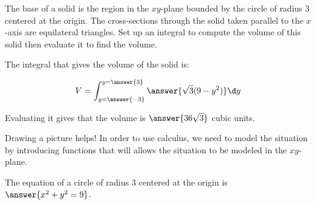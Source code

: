\documentclass{ximera}
\author{Jim Talamo and Alex Beckwith}
\begin{document}
\begin{exercise}
	The base of a solid is the region in the $xy$-plane bounded by the circle of radius 3 centered at the origin. The cross-sections through the solid taken parallel to the $x$-axis are equilateral triangles. Set up an integral to compute the volume of this solid then evaluate it to find the volume.
	
The integral that gives the volume of the solid is:

	\[
	V= \int_{y=\answer{-3}}^{y=\answer{3}}
	\answer{\sqrt{3} (9-y^2)}\d y
	\]

Evaluating it gives that the volume is $\answer{36\sqrt{3}}$ cubic units.
	
	\begin{hint}
	
	Drawing a picture helps!  In order to use calculus, we need to model the situation by introducing functions that will allows the situation to be modeled in the $xy$-plane.  
	
	\begin{exercise}
	The equation of a circle of radius 3 centered at the origin is $\answer{x^2+y^2=9}$.
	
	\begin{exercise}
	
	    \begin{image}
\end{image}
\end{exercise}
\end{exercise}
\end{hint}
\end{exercise}
\end{document}
